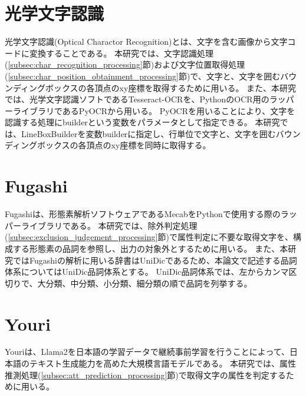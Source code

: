 \section{光学文字認識}\label{sec:Optical-Charactor-Recognition}
光学文字認識(Optical Charactor Recognition)とは、文字を含む画像から文字コードに変換することである\cite{光学文字認識}。
本研究では、文字認識処理(\ref{subsec:char_recognition_processing}節)および文字位置取得処理(\ref{subsec:char_position_obtainment_processing}節)で、文字と、文字を囲むバウンディングボックスの各頂点のxy座標を取得するために用いる。
また、本研究では、光学文字認識ソフトであるTesseract-OCRを、PythonのOCR用のラッパーライブラリであるPyOCRから用いる。
PyOCRを用いることにより、文字を認識する処理にbuilderという変数をパラメータとして指定できる。
本研究では、LineBoxBuilderを変数builderに指定し、行単位で文字と、文字を囲むバウンディングボックスの各頂点のxy座標を同時に取得する。

\section{Fugashi}\label{sec:Fugashi}
Fugashiは、形態素解析ソフトウェアであるMecabをPythonで使用する際のラッパーライブラリである\cite{Fugashi}。
本研究では、除外判定処理(\ref{subsec:exclusion_judgement_processing}節)で属性判定に不要な取得文字を、構成する形態素の品詞を参照し、出力の対象外とするために用いる。
また、本研究ではFugashiの解析に用いる辞書はUniDicであるため、本論文で記述する品詞体系についてはUniDic品詞体系とする。
UniDic品詞体系では、左からカンマ区切りで、大分類、中分類、小分類、細分類の順で品詞を列挙する\cite{UniDic品詞体系}。


\section{Youri}\label{sec:Youri}
Youriは、Llama2を日本語の学習データで継続事前学習を行うことによって、日本語のテキスト生成能力を高めた大規模言語モデルである\cite{Youri}。
本研究では、属性推測処理(\ref{subsec:att_prediction_processing}節)で取得文字の属性を判定するために用いる。